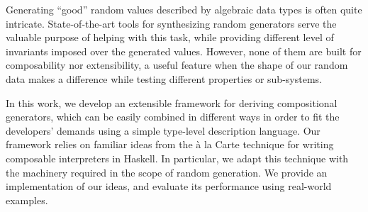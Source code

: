 Generating ``good'' random values described by algebraic data types is often
quite intricate.
%
State-of-the-art tools for synthesizing random generators serve the valuable
purpose of helping with this task, while providing different level of invariants
imposed over the generated values.
%
However, none of them are built for composability nor extensibility, a useful
feature when the shape of our random data makes a difference while testing
different properties or sub-systems.
%


In this work, we develop an extensible framework for deriving compositional
generators, which can be easily combined in different ways in order to fit the
developers' demands using a simple type-level description language.
%
Our framework relies on familiar ideas from the \`a la Carte technique for
writing composable interpreters in Haskell.
%
In particular, we adapt this technique with the machinery required in the scope
of random generation.
%
We provide an implementation of our ideas, and evaluate its performance using
real-world examples.
%